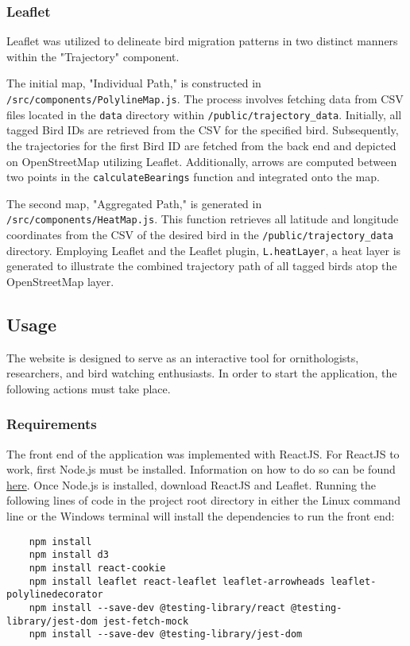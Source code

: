 \documentclass{article}
\begin{document}
\subsubsection{Leaflet}
Leaflet was utilized to delineate bird migration patterns in two distinct manners within the "Trajectory" component. 

The initial map, "Individual Path," is constructed in \texttt{/src/components/PolylineMap.js}. The process involves fetching data from CSV files located in the \texttt{data} directory within \texttt{/public/trajectory\_data}. Initially, all tagged Bird IDs are retrieved from the CSV for the specified bird. Subsequently, the trajectories for the first Bird ID are fetched from the back end and depicted on OpenStreetMap utilizing Leaflet. Additionally, arrows are computed between two points in the \texttt{calculateBearings} function and integrated onto the map.

The second map, "Aggregated Path," is generated in \texttt{/src/components/HeatMap.js}. This function retrieves all latitude and longitude coordinates from the CSV of the desired bird in the \texttt{/public/trajectory\_data} directory. Employing Leaflet and the Leaflet plugin, \texttt{L.heatLayer}, a heat layer is generated to illustrate the combined trajectory path of all tagged birds atop the OpenStreetMap layer.


\subsection{Usage}
The website is designed to serve as an interactive tool for ornithologists, researchers, and bird watching enthusiasts. In order to start the application, the following actions must take place.

\subsubsection{Requirements}

The front end of the application was implemented with ReactJS. For ReactJS to work, first Node.js must be installed. Information on how to do so can be found \href{https://nodejs.org/en/learn/getting-started/how-to-install-nodejs}{here}. Once Node.js is installed, download ReactJS and Leaflet. Running the following lines of code in the project root directory in either the Linux command line or the Windows terminal will install the dependencies to run the front end:
\begin{verbatim}
    npm install 
    npm install d3 
    npm install react-cookie 
    npm install leaflet react-leaflet leaflet-arrowheads leaflet-polylinedecorator 
    npm install --save-dev @testing-library/react @testing-library/jest-dom jest-fetch-mock 
    npm install --save-dev @testing-library/jest-dom
\end{verbatim}
\end{document}
